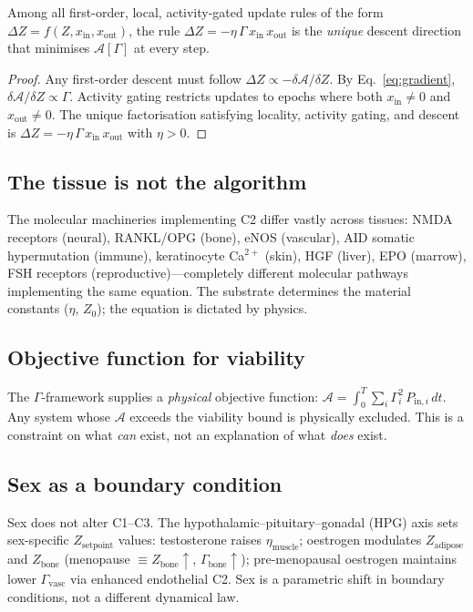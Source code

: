 \documentclass[aps,pre,twocolumn,superscriptaddress,floatfix]{revtex4-2}
\begin{document}
\begin{theorem}[C2 uniqueness]
\label{thm:unique}
Among all first-order, local, activity-gated update rules
of the form $\Delta Z = f(Z, x_{\text{in}}, x_{\text{out}})$,
the rule $\Delta Z = -\eta\,\Gamma\,x_{\text{in}}\,
x_{\text{out}}$ is the \emph{unique} descent direction
that minimises $\mathcal{A}[\Gamma]$ at every step.
\end{theorem}

\begin{proof}
Any first-order descent must follow
$\Delta Z \propto -\delta\mathcal{A}/\delta Z$.
By Eq.~\eqref{eq:gradient},
$\delta\mathcal{A}/\delta Z \propto \Gamma$.
Activity gating restricts updates to epochs where
both $x_{\text{in}} \neq 0$ and $x_{\text{out}} \neq 0$.
The unique factorisation satisfying locality, activity
gating, and descent is
$\Delta Z = -\eta\,\Gamma\,x_{\text{in}}\,x_{\text{out}}$
with $\eta > 0$.
\end{proof}

\subsection{The tissue is not the algorithm}

The molecular machineries implementing C2 differ vastly
across tissues: NMDA receptors (neural), RANKL/OPG (bone),
eNOS (vascular), AID somatic hypermutation (immune),
keratinocyte Ca$^{2+}$ (skin), HGF (liver), EPO (marrow),
FSH receptors (reproductive)---completely different
molecular pathways implementing the same equation.
The substrate determines the material constants
($\eta$, $Z_0$); the equation is dictated by physics.

\subsection{Objective function for viability}

The $\Gamma$-framework supplies a \emph{physical}
objective function:
$\mathcal{A} = \int_0^T \sum_i \Gamma_i^2\,
P_{\text{in},i}\,dt$.
Any system whose $\mathcal{A}$ exceeds the viability
bound is physically excluded.
This is a constraint on what \emph{can} exist, not
an explanation of what \emph{does} exist.

\subsection{Sex as a boundary condition}

Sex does not alter C1--C3.
The hypothalamic--pituitary--gonadal (HPG) axis sets
sex-specific $Z_{\text{setpoint}}$ values:
testosterone raises $\eta_{\text{muscle}}$;
oestrogen modulates $Z_{\text{adipose}}$ and
$Z_{\text{bone}}$ (menopause $\equiv Z_{\text{bone}}
\!\uparrow$, $\Gamma_{\text{bone}}\!\uparrow$);
pre-menopausal oestrogen maintains lower
$\Gamma_{\text{vasc}}$ via enhanced endothelial C2.
Sex is a parametric shift in boundary conditions,
not a different dynamical law.
\end{document}
